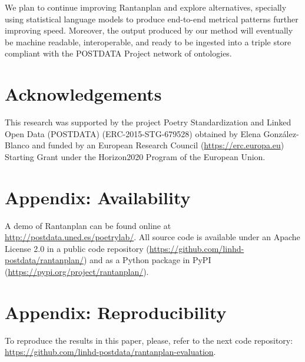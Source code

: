 \documentclass[a4paper,11pt,twocolumn,twoside]{article}
\begin{document}
We plan to continue improving Rantanplan and explore alternatives, specially using statistical language models to produce end-to-end metrical patterns further improving speed. Moreover, the output produced by our method will eventually be machine readable, interoperable, and ready to be ingested into a triple store compliant with the POSTDATA Project network of ontologies.

\section*{Acknowledgements}
This research was supported by the project Poetry Standardization and Linked Open Data (POSTDATA) (ERC-2015-STG-679528) obtained by Elena González-Blanco and funded by an European Research Council (\url{https://erc.europa.eu}) Starting Grant under the Horizon2020 Program of the European Union.




\appendix
\section{Appendix: Availability}
A demo of Rantanplan can be found online at \url{http://postdata.uned.es/poetrylab/}. All source code is available under an Apache License 2.0 in a public code repository (\url{https://github.com/linhd-postdata/rantanplan/}) and as a Python package in PyPI (\url{https://pypi.org/project/rantanplan/}).

\section{Appendix: Reproducibility}
To reproduce the results in this paper, please, refer to the next code repository: \url{https://github.com/linhd-postdata/rantanplan-evaluation}.
\end{document}
